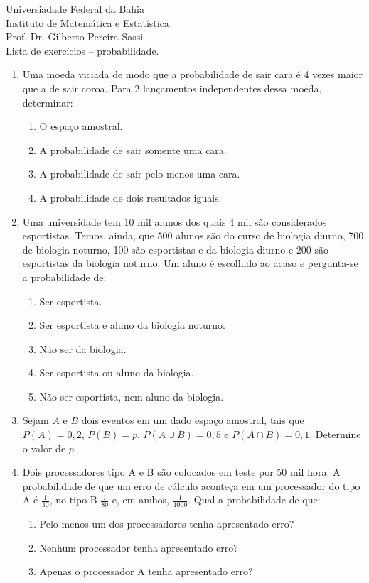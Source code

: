\documentclass[12pt, a4paper]{article}
\begin{document}
\begin{center}
Universiadade Federal da Bahia\\
Instituto de Matemática e Estatística\\
Prof. Dr. Gilberto Pereira Sassi\\
\vspace{1cm}
Lista de exercícios -- probabilidade.
\vspace{1cm}
\end{center}

\begin{enumerate}
    \item Uma moeda viciada de modo que a probabilidade de sair cara é 4 vezes maior que a de sair coroa. Para 2 lançamentos 
    independentes dessa moeda, determinar:
    \begin{enumerate}
     \item O espaço amostral.
     \item A probabilidade de sair somente uma cara.
     \item A probabilidade de sair pelo menos uma cara.
     \item A probabilidade de dois resultados iguais.
    \end{enumerate}


    \item Uma universidade tem 10 mil alunos dos quais 4 mil são considerados esportistas. Temos, ainda, que 500 alunos são do
    curso de biologia diurno, 700 de biologia noturno, 100 são esportistas e da biologia diurno e 200 são esportistas da biologia noturno. Um aluno é escolhido ao acaso e pergunta-se a probabilidade de:
    \begin{enumerate}
     \item Ser esportista.
     \item Ser esportista e aluno da biologia noturno.
     \item Não ser da biologia.
     \item Ser esportista ou aluno da biologia.
     \item Não ser esportista, nem aluno da biologia.
    \end{enumerate}
    
    \item Sejam $A$ e $B$ dois eventos em um dado espaço amostral, tais que $P(A)=0,2$, $P(B)=p$, $P(A \cup B)=0,5$ e
    $P(A \cap B)=0,1$. Determine o valor de $p$.
    
    \item Dois processadores tipo A e B são colocados em teste por 50 mil hora. A probabilidade de que um erro de cálculo aconteça em 
    um processador do tipo A é $\frac{1}{30}$, no tipo B $\frac{1}{80}$ e, em ambos, $\frac{1}{1000}$. Qual a probabilidade de que:
    \begin{enumerate}
     \item Pelo menos um dos processadores tenha apresentado erro?
     \item Nenhum processador tenha apresentado erro?
     \item Apenas o processador A tenha apresentado erro?
    \end{enumerate}


\end{enumerate}
\end{document}
